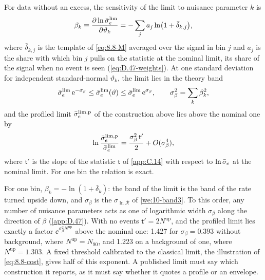 \begin{keyresult}
For data without an excess, the sensitivity of the limit to nuisance parameter $k$ is
\begin{equation}
  \beta_k \equiv \frac{\partial\ln\bar{\sigma}_{e}^{\mathrm{lim}}}{\partial\vartheta_k} = -\sum_ja_j\ln\bigl(1 + \bar\delta_{k,j}\bigr) ,
  \label{eq:21.4-beta}
\end{equation}
where $\bar\delta_{k,j}$ is the template of \cref{eq:8.8-M} averaged over the signal in bin $j$ and $a_j$ is the share with which bin $j$ pulls on the statistic at the nominal limit, its share of the signal when no event is seen (\cref{eq:D.47-weights}). At one standard deviation for independent standard-normal $\vartheta_k$, the limit lies in the theory band
\begin{equation}
  \bar{\sigma}_{e}^{\mathrm{lim}}\,\mathrm{e}^{-\sigma_\beta} \le \bar{\sigma}_{e}^{\mathrm{lim}}(\vartheta) \le \bar{\sigma}_{e}^{\mathrm{lim}}\,\mathrm{e}^{\sigma_\beta} , \qquad \sigma_\beta^2 = \sum_k\beta_k^2 ,
  \label{eq:21.4-band}
\end{equation}
and the profiled limit $\bar{\sigma}_{e}^{\mathrm{lim,p}}$ of the construction above lies above the nominal one by
\begin{equation}
  \ln\frac{\bar{\sigma}_{e}^{\mathrm{lim,p}}}{\bar{\sigma}_{e}^{\mathrm{lim}}} = \frac{\sigma_\beta^2\,\mathsf{t}'}{2} + O(\sigma_\beta^4) ,
  \label{eq:21.4-profile}
\end{equation}
where $\mathsf{t}'$ is the slope of the statistic $\mathsf{t}$ of \cref{app:C.14} with respect to $\ln\bar{\sigma}_{e}$ at the nominal limit. For one bin the relation is exact.
\end{keyresult}
\noindent For one bin, $\beta_k = -\ln(1 + \bar\delta_k)$: the band of the limit is the band of the rate turned upside down, and $\sigma_\beta$ is the $\sigma_{\ln\mathcal{R}}$ of \cref{we:10-band3}. To this order, any number of nuisance parameters acts as one of logarithmic width $\sigma_\beta$ along the direction of $\beta$ (\cref{app:D.47}). With no events $\mathsf{t}' = 2N^{\mathrm{up}}$, and the profiled limit lies exactly a factor $\ee^{\sigma_\beta^2N^{\mathrm{up}}}$ above the nominal one: 1.427 for $\sigma_\beta = 0.393$ without background, where $N^{\mathrm{up}} = N_{90}$, and 1.223 on a background of one, where $N^{\mathrm{up}} = 1.303$. A fixed threshold calibrated to the classical limit, the illustration of \cref{eq:8.8-cost}, gives half of this exponent. A published limit must say which construction it reports, as it must say whether it quotes a profile or an envelope.

